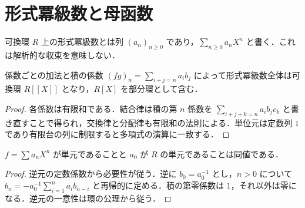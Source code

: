 \section{形式冪級数と母函数}
\begin{defn}[形式冪級数]
可換環 $R$ 上の形式冪級数とは列 $(a_n)_{n\geq0}$ であり，$\sum_{n\geq0}a_nX^n$ と書く．これは解析的な収束を意味しない．
\end{defn}
\begin{prop}[形式冪級数環]
係数ごとの加法と積の係数 $(fg)_n=\sum_{i+j=n}a_i b_j$ によって形式冪級数全体は可換環 $R[[X]]$ となり，$R[X]$ を部分環として含む．
\end{prop}
\begin{proof}
各係数は有限和である．結合律は積の第 $n$ 係数を $\sum_{i+j+k=n}a_i b_j c_k$ と書き直すことで得られ，交換律と分配律も有限和の法則による．単位元は定数列 $1$ であり有限台の列に制限すると多項式の演算に一致する．
\end{proof}
\begin{prop}[形式冪級数の単元判定]
$f=\sum a_nX^n$ が単元であることと $a_0$ が $R$ の単元であることは同値である．
\end{prop}
\begin{proof}
逆元の定数係数から必要性が従う．逆に $b_0=a_0^{-1}$ とし，$n>0$ について $b_n=-a_0^{-1}\sum_{i=1}^n a_i b_{n-i}$ と再帰的に定める．積の第零係数は $1$，それ以外は零になる．逆元の一意性は環の公理から従う．
\end{proof}

